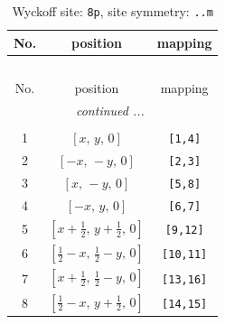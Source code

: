 \documentclass[fleqn,8pt]{jsarticle}
\begin{document}
\begin{longtable}{ccc}
\caption{Wyckoff site: {\tt 8p}, site symmetry: {\tt ..m}}
 \\
 \hline \hline
No. & position & mapping \\ \hline \endfirsthead

\multicolumn{2}{l}{\tablename\ \thetable{}} \\
 \hline \hline
No. & position & mapping \\ \hline \endhead

 \hline \hline
\multicolumn{2}{r}{\footnotesize\it continued ...} \\ \endfoot

 \hline \hline
\multicolumn{2}{r}{} \\ \endlastfoot

1 & $\left[ x,\, y,\, 0 \right]$ & {\tt [1,4]} \\ \hline
2 & $\left[ - x,\, - y,\, 0 \right]$ & {\tt [2,3]} \\ \hline
3 & $\left[ x,\, - y,\, 0 \right]$ & {\tt [5,8]} \\ \hline
4 & $\left[ - x,\, y,\, 0 \right]$ & {\tt [6,7]} \\ \hline
5 & $\left[ x + \frac{1}{2},\, y + \frac{1}{2},\, 0 \right]$ & {\tt [9,12]} \\ \hline
6 & $\left[ \frac{1}{2} - x,\, \frac{1}{2} - y,\, 0 \right]$ & {\tt [10,11]} \\ \hline
7 & $\left[ x + \frac{1}{2},\, \frac{1}{2} - y,\, 0 \right]$ & {\tt [13,16]} \\ \hline
8 & $\left[ \frac{1}{2} - x,\, y + \frac{1}{2},\, 0 \right]$ & {\tt [14,15]} \\
\end{longtable}
\renewcommand{\arraystretch}{1.2}
\end{document}
